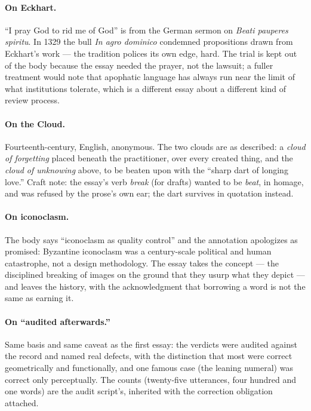 \documentclass[11pt]{article}
\begin{document}
\paragraph{On Eckhart.} ``I pray God to rid me of God'' is from the German sermon on \emph{Beati pauperes spiritu}. In 1329 the bull \emph{In agro dominico} condemned propositions drawn from Eckhart's work — the tradition polices its own edge, hard. The trial is kept out of the body because the essay needed the prayer, not the lawsuit; a fuller treatment would note that apophatic language has always run near the limit of what institutions tolerate, which is a different essay about a different kind of review process.

\paragraph{On the Cloud.} Fourteenth-century, English, anonymous. The two clouds are as described: a \emph{cloud of forgetting} placed beneath the practitioner, over every created thing, and the \emph{cloud of unknowing} above, to be beaten upon with the ``sharp dart of longing love.'' Craft note: the essay's verb \emph{break} (for drafts) wanted to be \emph{beat}, in homage, and was refused by the prose's own ear; the dart survives in quotation instead.

\paragraph{On iconoclasm.} The body says ``iconoclasm as quality control'' and the annotation apologizes as promised: Byzantine iconoclasm was a century-scale political and human catastrophe, not a design methodology. The essay takes the concept — the disciplined breaking of images on the ground that they usurp what they depict — and leaves the history, with the acknowledgment that borrowing a word is not the same as earning it.

\paragraph{On ``audited afterwards.''} Same basis and same caveat as the first essay: the verdicts were audited against the record and named real defects, with the distinction that most were correct geometrically and functionally, and one famous case (the leaning numeral) was correct only perceptually. The counts (twenty-five utterances, four hundred and one words) are the audit script's, inherited with the correction obligation attached.
\end{document}
